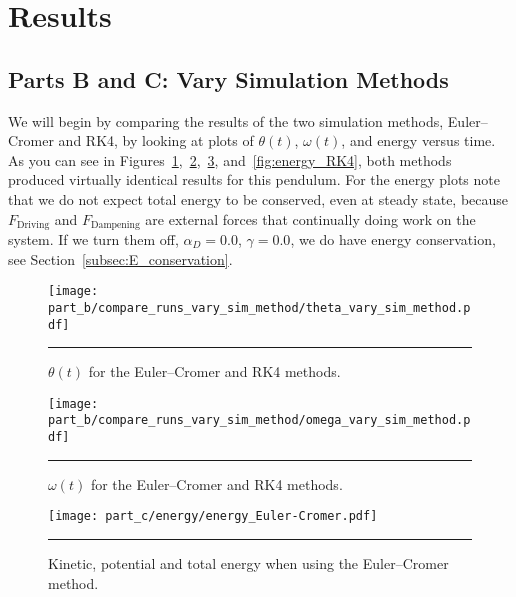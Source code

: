 \documentclass[notitlepage,aps,prd,nofootinbib]{revtex4-1}
\begin{document}
\clearpage
\section{Results}
\label{sec:results}

\subsection{Parts B and C: Vary Simulation Methods}
\label{subsec:vary_sim_methods}
We will begin by comparing the results of the two simulation methods, Euler--Cromer and RK4, by looking at plots of $\theta\left(t\right)$, $\omega\left(t\right)$, and energy versus time. As you can see in Figures~\ref{fig:theta_vary_sim_method},~\ref{fig:omega_vary_sim_method},~\ref{fig:energy_Euler-Cromer}, and~\ref{fig:energy_RK4}, both methods produced virtually identical results for this pendulum. For the energy plots note that we do not expect total energy to be conserved, even at steady state, because $F_{\text{Driving}}$ and $F_{\text{Dampening}}$ are external forces that continually doing work on the system. If we turn them off, $\alpha_{D} = 0.0$, $\gamma = 0.0$, we do have energy conservation, see Section~\ref{subsec:E_conservation}.

\begin{figure}[!htbc]
  \centering
  \texttt{[image: part\_b/compare\_runs\_vary\_sim\_method/theta\_vary\_sim\_method.pdf]}
	{\par\nobreak\rule[9pt]{35em}{0.5pt}\vspace{-5mm}}
	\caption{$\theta\left(t\right)$ for the Euler--Cromer and RK4 methods.}
	\label{fig:theta_vary_sim_method}
\end{figure}

\begin{figure}[!htbc]
  \centering
  \texttt{[image: part\_b/compare\_runs\_vary\_sim\_method/omega\_vary\_sim\_method.pdf]}
	{\par\nobreak\rule[9pt]{35em}{0.5pt}\vspace{-5mm}}
	\caption{$\omega\left(t\right)$ for the Euler--Cromer and RK4 methods.}
	\label{fig:omega_vary_sim_method}
\end{figure}

\begin{figure}[!htbc]
  \centering
  \texttt{[image: part\_c/energy/energy\_Euler-Cromer.pdf]}
	{\par\nobreak\rule[9pt]{35em}{0.5pt}\vspace{-5mm}}
	\caption{Kinetic, potential and total energy when using the Euler--Cromer method.}
	\label{fig:energy_Euler-Cromer}
\end{figure}
\end{document}
